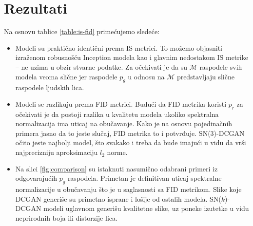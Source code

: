 \documentclass[12pt, a4paper]{article}
\begin{document}
\section{Rezultati}
Na osnovu tablice \ref{table:is-fid} primećujemo sledeće:
\begin{itemize}
	\item Modeli su praktično identični prema IS metrici. To možemo objasniti izraženom robusnošću Inception modela kao i glavnim nedostakom IS metrike -- ne uzima u obzir stvarne podatke. Za očekivati je da su $\mathcal{M}$ raspodele svih modela veoma slične jer raspodele $p_g$ u odnosu na $\mathcal{M}$ predstavljaju slične raspodele ljudskih lica.
	
	\item Modeli se razlikuju prema FID metrici. Budući da FID metrika koristi $p_r$ za očekivati je da postoji razlika u kvalitetu modela ukoliko spektralna normalizacija ima uticaj na obučavanje. Kako je na osnovu pojedinačnih primera jasno da to jeste slučaj, FID metrika to i potvrđuje. SN($3$)-DCGAN očito jeste najbolji model, što svakako i treba da bude imajući u vidu da vrši najprecizniju aproksimaciju $l_2$ norme.
	
	\item Na slici \ref{fig:comparison} su istaknuti nasumično odabrani primeri iz odgovarajućih $p_g$ raspodela. Primetan je definitivan uticaj spektralne normalizacije u obučavanju što je u saglasnosti sa  FID metrikom. Slike koje DCGAN generiše su primetno isprane i lošije od ostalih modela. SN($k$)-DCGAN modeli uglavnom generišu kvalitetne slike, uz poneke izutetke u vidu neprirodnih boja ili distorzije lica.
\end{itemize}
\end{document}

